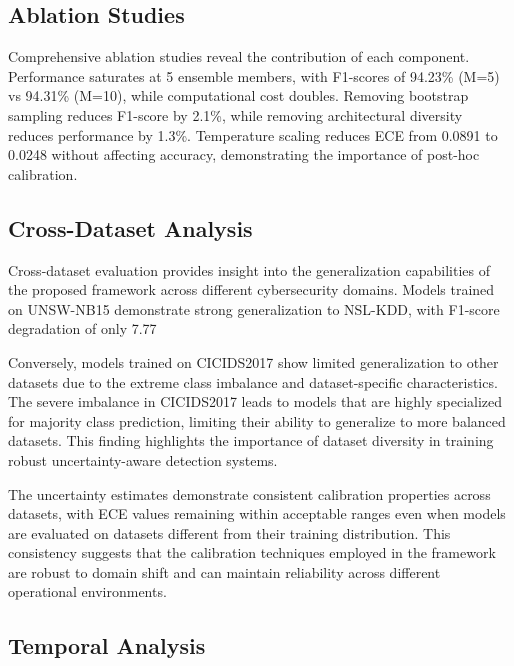 \documentclass[journal]{IEEEtran}
\begin{document}
\subsection{Ablation Studies}

Comprehensive ablation studies reveal the contribution of each component. Performance saturates at 5 ensemble members, with F1-scores of 94.23\% (M=5) vs 94.31\% (M=10), while computational cost doubles. Removing bootstrap sampling reduces F1-score by 2.1\%, while removing architectural diversity reduces performance by 1.3\%. Temperature scaling reduces ECE from 0.0891 to 0.0248 without affecting accuracy, demonstrating the importance of post-hoc calibration.

\subsection{Cross-Dataset Analysis}

Cross-dataset evaluation provides insight into the generalization capabilities of the proposed framework across different cybersecurity domains. Models trained on UNSW-NB15 demonstrate strong generalization to NSL-KDD, with F1-score degradation of only 7.77%

Conversely, models trained on CICIDS2017 show limited generalization to other datasets due to the extreme class imbalance and dataset-specific characteristics. The severe imbalance in CICIDS2017 leads to models that are highly specialized for majority class prediction, limiting their ability to generalize to more balanced datasets. This finding highlights the importance of dataset diversity in training robust uncertainty-aware detection systems.

The uncertainty estimates demonstrate consistent calibration properties across datasets, with ECE values remaining within acceptable ranges even when models are evaluated on datasets different from their training distribution. This consistency suggests that the calibration techniques employed in the framework are robust to domain shift and can maintain reliability across different operational environments.

\subsection{Temporal Analysis}
\end{document}
